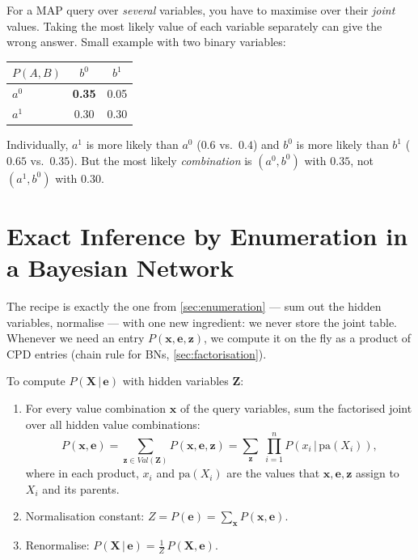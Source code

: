 \documentclass[11pt, oneside]{book}
\newcommand{\Prob}{\mathbb{P}}           %
\newcommand{\given}{\,\vert\,}           %
\newcommand{\Val}{\mathit{Val}}          %
\newcommand{\pa}{\mathrm{pa}}            %
\newcommand{\bX}{\mathbf{X}}  \newcommand{\bY}{\mathbf{Y}}
\newcommand{\bZ}{\mathbf{Z}}  \newcommand{\bE}{\mathbf{E}}
\newcommand{\bx}{\mathbf{x}}  \newcommand{\by}{\mathbf{y}}
\newcommand{\bz}{\mathbf{z}}  \newcommand{\be}{\mathbf{e}}
\let\originalsection\section
\renewcommand{\section}{\Needspace{7\baselineskip}\originalsection}
\begin{document}
\begin{notebox}[title={MAP of a set $\neq$ set of individual MAPs}]
For a MAP query over \emph{several} variables, you have to maximise over their
\emph{joint} values. Taking the most likely value of each variable separately
can give the wrong answer. Small example with two binary variables:
\begin{center}
\small
\begin{tabular}{@{}lcc@{}}
\toprule
$P(A, B)$ & $b^0$ & $b^1$ \\
\midrule
$a^0$ & \textbf{0.35} & 0.05 \\
$a^1$ & 0.30 & 0.30 \\
\bottomrule
\end{tabular}
\end{center}
Individually, $a^1$ is more likely than $a^0$ ($0.6$ vs.\ $0.4$) and $b^0$ is
more likely than $b^1$ ($0.65$ vs.\ $0.35$). But the most likely
\emph{combination} is $(a^0, b^0)$ with $0.35$, not $(a^1, b^0)$ with $0.30$.
\end{notebox}

\section{Exact Inference by Enumeration in a Bayesian Network}
\label{sec:bn-enumeration}

The recipe is exactly the one from \cref{sec:enumeration} --- sum out the
hidden variables, normalise --- with one new ingredient: we never store the
joint table. Whenever we need an entry $P(\bx, \be, \bz)$, we compute it on
the fly as a product of CPD entries (chain rule for BNs, \cref{sec:factorisation}).

\begin{thmbox}[title={Inference by enumeration in a Bayesian network}, unbreakable]
To compute $P(\bX \given \be)$ with hidden variables $\bZ$:
\begin{enumerate}
  \item For every value combination $\bx$ of the query variables, sum the
    factorised joint over all hidden value combinations:
    \[
    P(\bx, \be) = \sum_{\bz \in \Val(\bZ)} P(\bx, \be, \bz)
               = \sum_{\bz} \;\prod_{i=1}^{n} P(x_i \given \pa(X_i)),
    \]
    where in each product, $x_i$ and $\pa(X_i)$ are the values that $\bx, \be,
    \bz$ assign to $X_i$ and its parents.
  \item Normalisation constant: $Z = P(\be) = \sum_{\bx} P(\bx, \be)$.
  \item Renormalise: $P(\bX \given \be) = \frac{1}{Z}\, P(\bX, \be)$.
\end{enumerate}
\end{thmbox}
\end{document}
